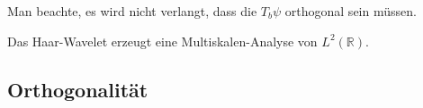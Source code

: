 Man beachte, es wird nicht verlangt, dass die $T_b\psi$ orthogonal
sein müssen.

\begin{beispiel}
Das Haar-Wavelet erzeugt eine Multiskalen-Analyse von $L^2(\mathbb R)$.
\end{beispiel}

\begin{beispiel}
\end{beispiel}

\subsection{Orthogonalität}

